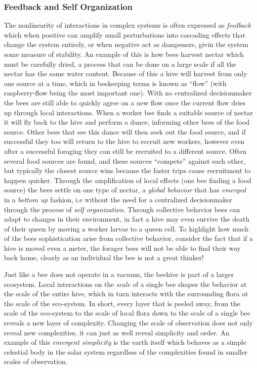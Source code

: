 \subsubsection{Feedback and Self Organization}
The nonlinearity of interactions in complex systems is often expressed as
\emph{feedback} which when positive can amplify small perturbations into
cascading effects that change the system entirely, or when negative act as
dampeners, givin the system some measure of stability.
An example of this is how bees harvest nectar which must be carefully dried, a
process that can be done on a large scale if all the nectar has the same water
content.
Because of this a hive will harvest from only one source at a time, which in
beekeeping terms is known as ``flow'' (with raspberry-flow being the most
important one).
With no centralized decisionmaker the bees are still able to quickly agree on a
new flow once the current flow dries up through local interactions.
When a worker bee finds a suitable source of nectar it will fly back to the hive
and perform a dance, informing other bees of the food source.
Other bees that see this dance will then seek out the food source, and if
successful they too will return to the hive to recruit new workers, however even
after a successful foraging they can still be recruited to a different source.
Often several food sources are found, and these sources ``compete'' against each
other, but typically the closest source wins because the faster trips cause
recruitment to happen quicker.
Through the amplification of local effects (one bee finding a food source) the
bees settle on one type of nectar, a \emph{global behavior} that has
\emph{emerged} in a \emph{bottom up} fashion, i.e without the need for
a centralized decisionmaker through the process of \emph{self organization}.
Through collective behavior bees can adapt to changes in their environment, in
fact a hive may even survive the death of their queen by moving a worker larvae
to a queen cell.
To highlight how much of the bees sophistication arise from collective behavior,
consider the fact that if a hive is moved even a meter, the forager bees will
not be able to find their way back home, clearly as an individual the bee is not
a great thinker!
\par
%
Just like a bee does not operate in a vacuum, the beehive is part of a larger
ecosystem.
Local interactions on the \emph{scale} of a single bee shapes the behavior at
the scale of the entire hive, which in turn interacts with the surrounding flora
at the scale of the eco-system.
In short, every layer that is peeled away, from the scale of the eco-system to
the scale of local flora down to the scale of a single bee reveals a new layer
of complexity.
Changing the scale of observation does not only reveal new complexities, it can
just as well reveal simplicity and order.
An example of this \emph{emergent simplicity} is the earth itself which behaves
as a simple celestial body in the solar system regardless of the complexities
found in smaller scales of observation.
%
